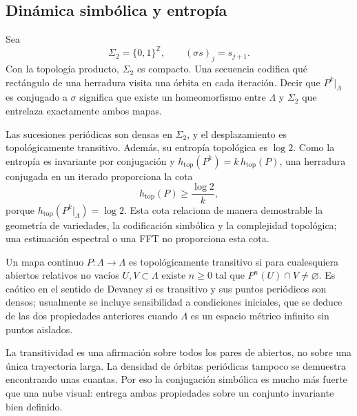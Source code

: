 \subsection{Dinámica simbólica y entropía}

\begin{definition}
Sea
\begin{equation}
 \Sigma_2=\{0,1\}^{\mathbb Z},\qquad
 (\sigma s)_j=s_{j+1}.
 \label{geo:eq:full-shift}
\end{equation}
Con la topología producto, \(\Sigma_2\) es compacto. Una secuencia codifica qué
rectángulo de una herradura visita una órbita en cada iteración. Decir que
\(P^k|_\Lambda\) es conjugado a \(\sigma\) significa que existe un
homeomorfismo entre \(\Lambda\) y \(\Sigma_2\) que entrelaza exactamente ambos
mapas.
\end{definition}

Las sucesiones periódicas son densas en \(\Sigma_2\), y el desplazamiento es
topológicamente transitivo. Además, su entropía topológica es \(\log2\). Como
la entropía es invariante por conjugación y
\(h_{\mathrm{top}}(P^k)=k\,h_{\mathrm{top}}(P)\), una herradura conjugada en
un iterado proporciona la cota
\begin{equation}
 h_{\mathrm{top}}(P)\ge\frac{\log2}{k},
 \label{geo:eq:horseshoe-entropy-bound}
\end{equation}
porque \(h_{\mathrm{top}}(P^k|_\Lambda)=\log2\). Esta cota relaciona de manera
demostrable la geometría de variedades, la codificación simbólica y la complejidad
topológica; una estimación espectral o una FFT no proporciona esta cota.

\begin{definition}
Un mapa continuo \(P:\Lambda\to\Lambda\) es topológicamente transitivo si para
cualesquiera abiertos relativos no vacíos \(U,V\subset\Lambda\) existe
\(n\ge0\) tal que \(P^n(U)\cap V\ne\varnothing\). Es caótico en el sentido de
Devaney si es transitivo y sus puntos periódicos son densos; usualmente se
incluye sensibilidad a condiciones iniciales, que se deduce de las dos
propiedades anteriores cuando \(\Lambda\) es un espacio métrico infinito sin
puntos aislados.
\end{definition}

La transitividad es una afirmación sobre todos los pares de abiertos, no sobre
una única trayectoria larga. La densidad de órbitas periódicas tampoco se
demuestra encontrando unas cuantas. Por eso la conjugación simbólica es mucho
más fuerte que una nube visual: entrega ambas propiedades sobre un conjunto
invariante bien definido.

